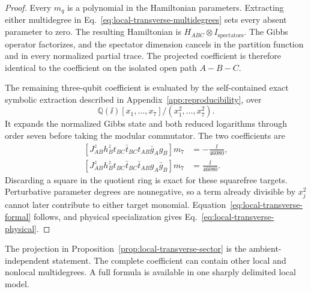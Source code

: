 \begin{proof}
Every $m_q$ is a polynomial in the Hamiltonian parameters.  Extracting either
multidegree in Eq.~\eqref{eq:local-transverse-multidegrees} sets every absent
parameter to zero.  The resulting Hamiltonian is
$H_{ABC}\otimes I_{\mathrm{spectators}}$.  The Gibbs operator factorizes,
and the spectator dimension cancels in the partition function and in every
normalized partial trace.  The projected coefficient is therefore identical
to the coefficient on the isolated open path $A\!-\!B\!-\!C$.

The remaining three-qubit coefficient is evaluated by the self-contained
exact symbolic extraction described in Appendix~\ref{app:reproducibility},
over
\begin{equation*}
 \mathbb Q(\ii)[x_1,\ldots,x_7]
 \big/(x_1^2,\ldots,x_7^2).
\end{equation*}
It expands the normalized Gibbs state and both reduced logarithms through
order seven before taking the modular commutator.  The two coefficients are
\begin{align}
 \left[J^z_{AB}h_B^z t_{BC}\bar t_{BC}t_{AB}\bar g_Ag_B\right]m_7
 &=-\frac{\ii}{46080},
 \nonumber\\
 \left[J^z_{AB}h_B^z t_{BC}\bar t_{BC}\bar t_{AB}g_A\bar g_B\right]m_7
 &=\frac{\ii}{46080}.
 \label{eq:local-transverse-extracted-pair}
\end{align}
Discarding a square in the quotient ring is exact for these squarefree
targets.  Perturbative parameter degrees are nonnegative, so a term already
divisible by $x_j^2$ cannot later contribute to either target monomial.
Equation~\eqref{eq:local-transverse-formal} follows, and physical
specialization gives Eq.~\eqref{eq:local-transverse-physical}.
\end{proof}

The projection in Proposition~\ref{prop:local-transverse-sector} is the
ambient-independent statement.  The complete coefficient can contain other
local and nonlocal multidegrees.  A full formula is available in one sharply
delimited local model.

